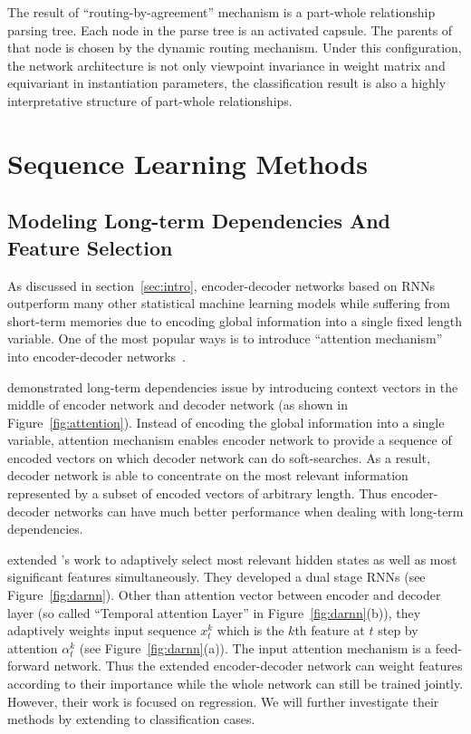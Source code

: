 \documentclass{article} \usepackage{tabularx}
\renewcommand{\citename}{\citet} \renewcommand{\cite}{\citep}
\begin{document}
The result of ``routing-by-agreement'' mechanism is a part-whole
relationship parsing tree. Each node in the parse tree is an
activated capsule. The parents of that node is chosen by the
dynamic routing mechanism. Under this configuration, the network
architecture is not only viewpoint invariance in weight matrix
and equivariant in instantiation parameters, the classification
result is also a highly interpretative structure of part-whole
relationships.

\section{Sequence Learning Methods}
\label{sec:method}

\subsection{Modeling Long-term Dependencies And Feature
  Selection}
\label{sec:ltfs}

As discussed in section~\ref{sec:intro}, encoder-decoder networks
based on RNNs outperform many other statistical machine learning
models while suffering from short-term memories due to encoding
global information into a single fixed length variable. One of
the most popular ways is to introduce ``attention mechanism''
into encoder-decoder networks~\cite{attention}.

\citename{attention} demonstrated long-term dependencies issue by
introducing context vectors in the middle of encoder network and
decoder network (as shown in Figure~\ref{fig:attention}). Instead
of encoding the global information into a single variable,
attention mechanism enables encoder network to provide a sequence
of encoded vectors on which decoder network can do soft-searches.
As a result, decoder network is able to concentrate on the most
relevant information represented by a subset of encoded vectors
of arbitrary length. Thus encoder-decoder networks can have much
better performance when dealing with long-term dependencies.

\citename{qin2017dual} extended \citename{attention}'s work to
adaptively select most relevant hidden states as well as most
significant features simultaneously. They developed a dual stage
RNNs (see Figure~\ref{fig:darnn}). Other than attention vector
between encoder and decoder layer (so called ``Temporal attention
Layer'' in Figure~\ref{fig:darnn}(b)), they adaptively weights
input sequence $x_t^k$ which is the $k$th feature at $t$ step by
attention $\alpha_t^k$ (see Figure~\ref{fig:darnn}(a)). The input
attention mechanism is a feed-forward network. Thus the extended
encoder-decoder network can weight features according to their
importance while the whole network can still be trained jointly.
However, their work is focused on regression. We will further
investigate their methods by extending to classification cases.
\end{document}
